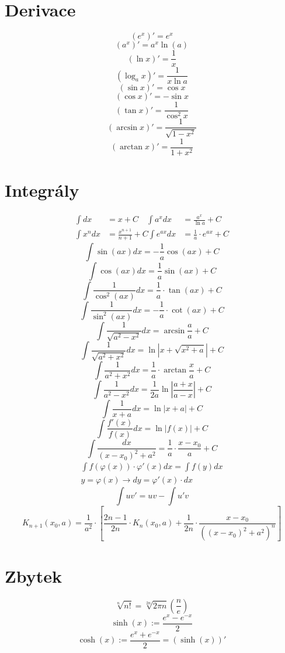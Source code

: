 \documentclass[a4paper]{article}
\begin{document}
\begin{multicols*}{2}
    \section*{Derivace}
        \[ (e^x)' = e^x \]
        \[ (a^x)' = a^x \ln(a) \]
        \[ (\ln x)' = \frac{1}{x} \]
        \[ (\log_a x)' = \frac{1}{x\ln a} \]
        \[ (\sin x)' = \cos x \]
        \[ (\cos x)' = -\sin x \]
        \[ (\tan x)' = \frac{1}{{\cos}^2 x} \]
        \[ (\arcsin x)' = \frac{1}{\sqrt{1-x^2}} \]
        \[ (\arctan x)' = \frac{1}{1+x^2} \]
    \section*{Integrály}
        \begin{align*} %
            {\int dx } &= {x+C} \quad {\int a^x dx} &= {\frac{a^x}{\ln a} + C} \\
            {\int x^n dx} &= {\frac{x^{n+1}}{n+1} + C}  {\int e^{ax} dx} &= {\frac{1}{a} \cdot e^{ax} + C}
        \end{align*}
        \[ \int \sin(ax) dx = -\frac{1}{a}\cos(ax) + C \]
        \[ \int \cos(ax) dx = \frac{1}{a}\sin(ax) + C \]
        \[ \int \frac{1}{\cos^2(ax)} dx = \frac{1}{a} \cdot \tan(ax) + C \]
        \[ \int \frac{1}{\sin^2(ax)} dx = -\frac{1}{a} \cdot \cot(ax) + C \]
        \[ \int \frac{1}{\sqrt{a^2 - x^2}} dx = \arcsin\frac{a}{a} + C \]
        \[ \int \frac{1}{\sqrt{a^2 + x^2}} dx = \ln \left| x + \sqrt{x^2 + a} \right| + C \]
        \[ \int \frac{1}{a^2 + x^2}dx = \frac{1}{a} \cdot \arctan\frac{x}{a} + C \]
        \[ \int \frac{1}{a^2 - x^2}dx = \frac{1}{2a}\ln\left|\frac{a+x}{a-x}\right| + C \]
        \[ \int \frac{1}{x+a}dx = \ln \left| x+a \right| + C \]
        {\[ \int \frac{f'(x)}{f(x)}dx = \ln\left| f(x)\right| + C \]}
        {\[ \int \frac{dx}{{(x-x_0)}^2 + a^2} = \frac{1}{a} \cdot \frac{x-x_0}{a} + C \]}
        \begin{align*}
            { \int f(\varphi(x)) \cdot \varphi'(x)dx = \int f(y)dx }\\
            { y = \varphi(x) \rightarrow dy = \varphi'(x) \cdot dx }
        \end{align*}
         \[ \int uv' = uv - \int u'v \]
        \[ K_{n+1}(x_0, a) = \frac{1}{a^2} \cdot \left[ \frac{2n-1}{2n} \cdot K_n(x_0, a) + \frac{1}{2n} \cdot \frac{x - x_0}{{({(x-x_0)}^2 + a^2)}^n} \right] \]
        \section*{Zbytek}
        \[ \sqrt[n]{n!} = \sqrt[2n]{2\pi n}\left(\frac{n}{e}\right) \]
        \[ \sinh(x):= \frac{e^x - e^{-x}}{2} \]
        \[ \cosh(x) := \frac{e^x + e^{-x}}{2} = (\sinh(x))' \]
\end{multicols*}
\end{document}
